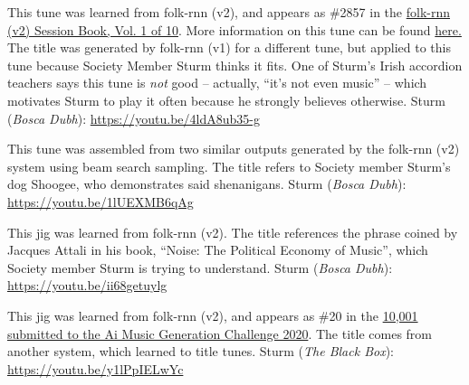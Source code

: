 \documentclass[a4paper,notitlepage,twoside]{book}
\begin{document}
{}  
\hypertarget{jig:GarrettFarmors}{}
This tune was learned from folk-rnn (v2),
and appears as \#2857 in
the \href{https://highnoongmt.wordpress.com/2018/01/05/volumes-1-20-of-folk-rnn-v1-transcriptions}{folk-rnn (v2) Session Book, Vol. 1 of 10}.
More information on this tune can be found \href{https://highnoongmt.wordpress.com/2017/12/02/folk-rnn-v2-tune-2857/}{here.}
The title was generated by folk-rnn (v1) for a different tune, 
but applied to this tune because Society Member Sturm thinks it fits.
One of Sturm's Irish accordion teachers says this tune is {\em not} good -- actually, ``it's not even music'' --
which motivates Sturm to play it often because he strongly believes otherwise.
Sturm ({\em Bosca Dubh}): \url{https://youtu.be/4ldA8ub35-g}

{}  
\hypertarget{jig:ShoogeesShenanigans}{}
This tune was assembled from two similar outputs generated by 
the folk-rnn (v2) system using beam search sampling.
The title refers to Society member Sturm's dog Shoogee, 
who demonstrates said shenanigans. 
Sturm ({\em Bosca Dubh}): \url{https://youtu.be/1lUEXMB6qAg}

{}  
\hypertarget{jig:CrisisProliferation}{}
This jig was learned from folk-rnn (v2).
The title references the phrase coined by Jacques Attali in his book,
``Noise: The Political Economy of Music'',
which Society member Sturm is trying to understand.
Sturm ({\em Bosca Dubh}): \url{https://youtu.be/ii68getuylg}

{}  
\hypertarget{jig:Humoursofbringa}{}
This jig was learned from folk-rnn (v2), and appears as \#20 in the
\href{https://github.com/boblsturm/aimusic2020/blob/master/tunes_folkrnnv2.pdf}{10,001 submitted to the Ai Music Generation Challenge 2020}.
The title comes from another system, which learned to title tunes.
Sturm ({\em The Black Box}): \url{https://youtu.be/y1lPpIELwYc}
\end{document}

